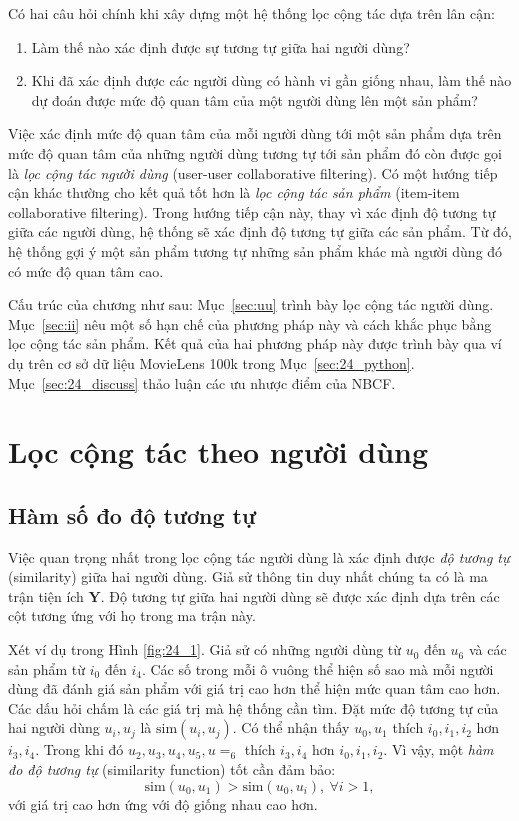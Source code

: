 Có hai câu hỏi chính khi xây dựng một hệ thống lọc cộng tác dựa trên lân cận:
\begin{enumerate}
    \item Làm thế nào xác định được {sự tương tự} giữa hai người dùng?
    \item Khi đã xác định được các người dùng có hành vi {gần giống nhau}, làm thế nào dự đoán được {mức độ quan tâm} của một người dùng lên một sản phẩm?
\end{enumerate}
 
Việc xác định mức độ quan tâm của mỗi người dùng tới một sản phẩm dựa trên mức
độ quan tâm của những người dùng tương tự tới sản phẩm đó còn được gọi là
\textit{lọc cộng tác người dùng} (user-user collaborative filtering). Có
một hướng tiếp cận khác thường cho kết quả tốt hơn là \textit{lọc cộng tác
sản phẩm} (item-item collaborative filtering). Trong hướng tiếp cận này, thay vì
xác định độ tương tự giữa các người dùng, hệ thống sẽ xác định độ tương tự
giữa các sản phẩm. Từ đó, hệ thống gợi ý một sản phẩm tương tự những sản phẩm
khác mà người dùng đó có mức độ quan tâm cao.
 
Cấu trúc của chương như sau: Mục~\ref{sec:uu} trình bày lọc cộng tác người
dùng. Mục~\ref{sec:ii} nêu một số hạn chế của phương pháp này và cách khắc phục
bằng lọc cộng tác sản phẩm. Kết quả của hai phương pháp này được trình bày
qua ví dụ trên cơ sở dữ liệu MovieLens 100k trong Mục~\ref{sec:24_python}.
Mục~\ref{sec:24_discuss} thảo luận các ưu nhược điểm của NBCF.
 
 
\section{Lọc cộng tác theo người dùng}
\label{sec:uu}
\subsection{Hàm số đo độ tương tự}
Việc quan trọng nhất trong lọc cộng tác người dùng là xác định được
\textit{độ tương tự} ({similarity}) giữa hai người dùng. Giả sử thông tin duy
nhất chúng ta có là ma trận tiện ích $\mathbf{Y}$. Độ tương tự giữa hai người
dùng sẽ được xác định dựa trên các cột tương ứng với họ trong ma trận này.

Xét ví dụ trong Hình \ref{fig:24_1}. Giả sử có những người dùng từ $u_0$ đến
$u_6$ và các sản phẩm từ $i_0$ đến $i_4$.  Các số trong mỗi ô vuông thể hiện {số
sao} mà mỗi người dùng đã đánh giá sản phẩm với giá trị cao hơn thể hiện {mức
quan tâm} cao hơn. Các dấu hỏi chấm là các giá trị mà hệ thống cần tìm. Đặt {mức
độ tương tự} của hai người dùng $u_i, u_j$ là $\text{sim}(u_i, u_j)$. Có thể
nhận thấy $u_0, u_1$ {thích} $i_0, i_1, i_2$ hơn $i_3, i_4$. Trong khi đó $u_2,
u_3, u_4, u_5, u=_6$ thích $i_3, i_4$ hơn $i_0, i_1, i_2$. Vì vậy, một
\textit{hàm đo độ tương tự} ({similarity function}) tốt cần đảm bảo:
\begin{equation}
\text{sim}(u_0, u_1) > \text{sim}(u_0, u_i), ~\forall i > 1,
\end{equation} 
với giá trị cao hơn ứng với độ giống nhau cao hơn. 

